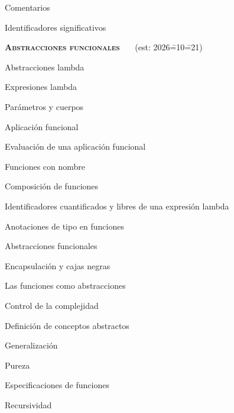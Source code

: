 \begin{longenum}
\begin{longenum}
\begin{longenum}
            \item Comentarios
            \item Identificadores significativos
        \end{longenum}
    \end{longenum}
    \item \textbf{\textsc{Abstracciones funcionales}} \ \ \ (est: 2026\==10\==21)
    \begin{longenum}
        \item Abstracciones lambda
        \begin{longenum}
            \item Expresiones lambda
            \item Parámetros y cuerpos
            \item Aplicación funcional
            \begin{longenum}
                \item Evaluación de una aplicación funcional
                \item Funciones con nombre
                \item Composición de funciones
            \end{longenum}
            \item Identificadores cuantificados y libres de una expresión lambda
            \item Anotaciones de tipo en funciones
        \end{longenum}
        \item Abstracciones funcionales
        \begin{longenum}
            \item Encapsulación y cajas negras
            \item Las funciones como abstracciones
            \begin{longenum}
                \item Control de la complejidad
                \item Definición de conceptos abstractos
                \item Generalización
            \end{longenum}
            \item Pureza
            \item Especificaciones de funciones
        \end{longenum}
        \item Recursividad \opcional\
        \begin{longenum}

\end{longenum}
\end{longenum}
\end{longenum}
